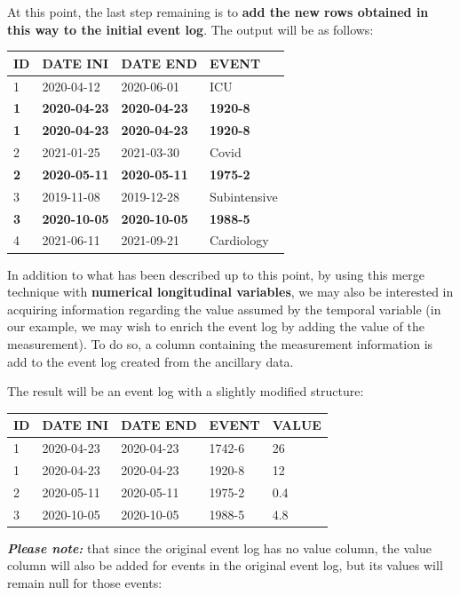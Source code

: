 \documentclass[
]{book}
\begin{document}
At this point, the last step remaining is to \textbf{add the new rows obtained in this way to the initial event log}. The output will be as follows:

\begin{longtable}[]{@{}llll@{}}
\toprule
ID & DATE INI & DATE END & EVENT \\
\midrule
\endhead
1 & 2020-04-12 & 2020-06-01 & ICU \\
\textbf{1} & \textbf{2020-04-23} & \textbf{2020-04-23} & \textbf{1920-8 } \\
\textbf{1} & \textbf{2020-04-23} & \textbf{2020-04-23} & \textbf{1920-8 } \\
2 & 2021-01-25 & 2021-03-30 & Covid \\
\textbf{2} & \textbf{2020-05-11} & \textbf{2020-05-11} & \textbf{1975-2} \\
3 & 2019-11-08 & 2019-12-28 & Subintensive \\
\textbf{3} & \textbf{2020-10-05} & \textbf{2020-10-05} & \textbf{1988-5} \\
4 & 2021-06-11 & 2021-09-21 & Cardiology \\
\bottomrule
\end{longtable}

In addition to what has been described up to this point, by using this merge technique with \textbf{numerical longitudinal variables}, we may also be interested in acquiring information regarding the value assumed by the temporal variable (in our example, we may wish to enrich the event log by adding the value of the measurement). To do so, a column containing the measurement information is add to the event log created from the ancillary data.

The result will be an event log with a slightly modified structure:

\begin{longtable}[]{@{}lllll@{}}
\toprule
ID & DATE INI & DATE END & EVENT & VALUE \\
\midrule
\endhead
1 & 2020-04-23 & 2020-04-23 & 1742-6 & 26 \\
1 & 2020-04-23 & 2020-04-23 & 1920-8 & 12 \\
2 & 2020-05-11 & 2020-05-11 & 1975-2 & 0.4 \\
3 & 2020-10-05 & 2020-10-05 & 1988-5 & 4.8 \\
\bottomrule
\end{longtable}

\textbf{\emph{Please note:}} that since the original event log has no value column, the value column will also be added for events in the original event log, but its values will remain null for those events:
\end{document}
